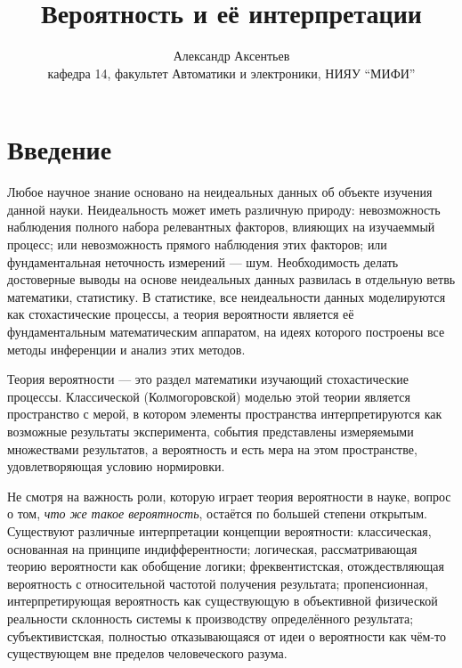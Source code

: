 \documentclass[14pt]{extarticle}
\begin{document}
\title{Вероятность и её интерпретации}
\date{}
\author{Александр Аксентьев\\ кафедра 14, факультет Автоматики и электроники, НИЯУ ``МИФИ''}
\maketitle

\tableofcontents

\section*{Введение}

Любое научное знание основано на неидеальных данных об объекте изучения данной науки. Неидеальность может иметь различную природу: невозможность наблюдения полного набора релевантных факторов, влияющих на изучаеммый процесс; или невозможность прямого наблюдения этих факторов; или фундаментальная неточность измерений --- шум. Необходимость делать достоверные выводы на основе неидеальных данных развилась в отдельную ветвь математики, статистику. В статистике, все неидеальности данных моделируются как стохастические процессы, а теория вероятности является её фундаментальным математическим аппаратом, на идеях которого построены все методы инференции и анализ этих методов.~\cite{Shalizi}

Теория вероятности --- это раздел математики изучающий стохастические процессы. Классической (Колмогоровской) моделью этой теории является пространство с мерой, в котором элементы пространства интерпретируются как возможные результаты эксперимента, события представлены измеряемыми множествами результатов, а вероятность и есть мера на этом пространстве, удовлетворяющая условию нормировки. 

Не смотря на важность роли, которую играет теория вероятности в науке, вопрос о том, \emph{что же такое вероятность}, остаётся по большей степени открытым. Существуют различные интерпретации концепции вероятности: классическая, основанная на принципе индифферентности; логическая, рассматривающая теорию вероятности как обобщение логики; фреквентистская, отождествляющая вероятность с относительной частотой получения результата; пропенсионная, интерпретирующая вероятность как существующую в объективной физической реальности склонность системы к производству определённого результата; субъективистская, полностью отказывающаяся от идеи о вероятности как чём-то существующем вне пределов человеческого разума.~\cite{Hajek}
\end{document}
